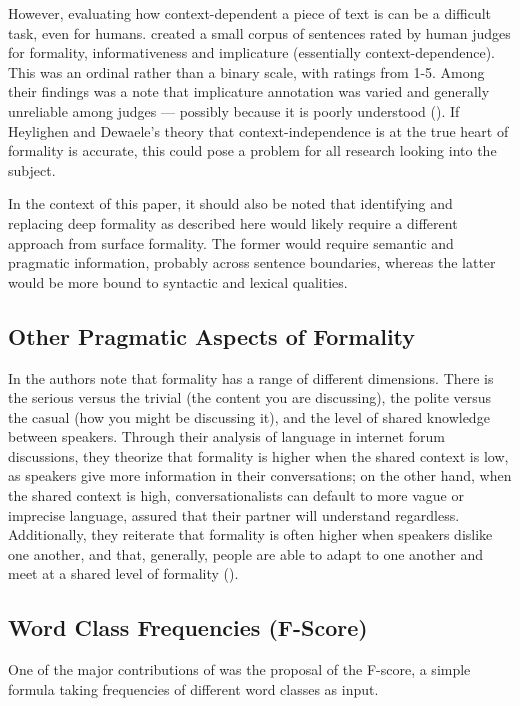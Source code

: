 However, evaluating how context-dependent a piece of text is can be a difficult task, even for humans. \cite{lahiri2015squinky} created a small corpus of sentences rated by human judges for formality, informativeness and implicature (essentially context-dependence). This was an ordinal rather than a binary scale, with ratings from 1-5. Among their findings was a note that implicature annotation was varied and generally unreliable among judges --- possibly because it is poorly understood (\cite{lahiri2015squinky}). If Heylighen and Dewaele's theory that context-independence is at the true heart of formality is accurate, this could pose a problem for all research looking into the subject.

In the context of this paper, it should also be noted that identifying and replacing deep formality as described here would likely require a different approach from surface formality. The former would require semantic and pragmatic information, probably across sentence boundaries, whereas the latter would be more bound to syntactic and lexical qualities.

\subsection{Other Pragmatic Aspects of Formality}

In \cite{pavlick2016empirical} the authors note that formality has a range of different dimensions. There is the serious versus the trivial (the content you are discussing), the polite versus the casual (how you might be discussing it), and the level of shared knowledge between speakers. Through their analysis of language in internet forum discussions, they theorize that formality is higher when the shared context is low, as speakers give more information in their conversations; on the other hand, when the shared context is high, conversationalists can default to more vague or imprecise language, assured that their partner will understand regardless. Additionally, they reiterate that formality is often higher when speakers dislike one another, and that, generally, people are able to adapt to one another and meet at a shared level of formality (\cite{pavlick2016empirical}).

\subsection{Word Class Frequencies (F-Score)} \label{fscore}

One of the major contributions of \cite{heylighen1999formality} was the proposal of the F-score, a simple formula taking frequencies of different word classes as input. 

